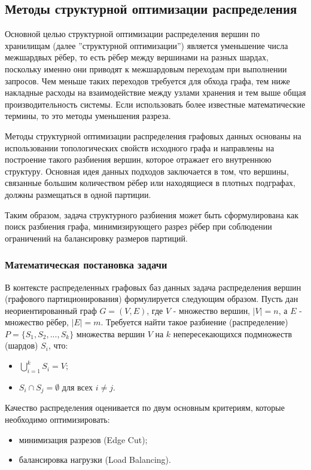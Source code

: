 \subsection{Методы структурной оптимизации распределения} 

Основной целью структурной оптимизации распределения вершин по хранилищам (далее ''структурной оптимизации'') является уменьшение числа межшардвых рёбер, то есть рёбер между вершинами на разных шардах, поскольку именно они приводят к межшардовым переходам при выполнении запросов. Чем меньше таких переходов требуется для обхода графа, тем ниже накладные расходы на взаимодействие между узлами хранения и тем выше общая производительность системы. Если использовать более известные математические термины, то это методы уменьшения разреза.

Методы структурной оптимизации распределения графовых данных основаны на использовании топологических свойств исходного графа и направлены на построение такого разбиения вершин, которое отражает его внутреннюю структуру. Основная идея данных подходов заключается в том, что вершины, связанные большим количеством рёбер или находящиеся в плотных подграфах, должны размещаться в одной партиции.

Таким образом, задача структурного разбиения может быть сформулирована как поиск разбиения графа, минимизирующего разрез рёбер при соблюдении ограничений на балансировку размеров партиций.

\subsubsection{Математическая постановка задачи}

В контексте распределенных графовых баз данных задача распределения вершин (графового партиционирования) формулируется следующим образом. Пусть дан неориентированный граф $G = (V, E)$, где $V$ - множество вершин, $|V| = n$, а $E$ - множество рёбер, $|E| = m$. Требуется найти такое разбиение (распределение) $P = \{S_1, S_2, ..., S_k\}$ множества вершин $V$ на $k$ непересекающихся подмножеств (шардов) $S_i$, что:
\begin{itemize}
    \item $\bigcup_{i=1}^{k} S_i = V$;
    \item $S_i \cap S_j = \emptyset$ для всех $i \neq j$.
\end{itemize}

Качество распределения оценивается по двум основным критериям, которые необходимо оптимизировать:
\begin{itemize}
    \item минимизация разрезов (Edge Cut);
    \item балансировка нагрузки (Load Balancing). 
\end{itemize}

